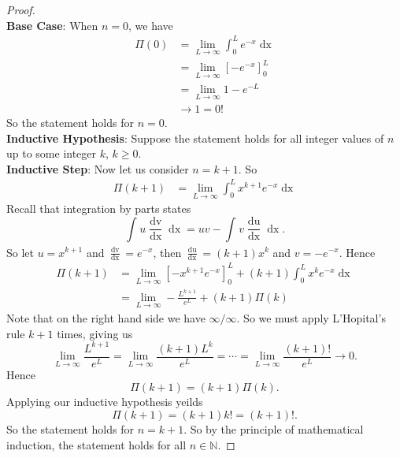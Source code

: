 \documentclass[12pt,oneside]{book}
\begin{document}
\begin{enumerate}
        \begin{proof} \hspace{1mm} \\
            \textbf{Base Case}: When $n = 0$, we have \begin{align*}
                \Pi(0) &= \lim_{L \to \infty}  \int_{0}^{L} e^{-x} \mathop{\mathrm{d}x} \\ 
                &= \lim_{L \to \infty}  \left[ - e^{-x} \right]_0^{L} \\
                &= \lim_{L \to \infty} 1 - e^{-L} \\
                &\to 1 = 0!  
            \end{align*}
            So the statement holds for $n = 0$. \\
            \textbf{Inductive Hypothesis}: Suppose the statement holds for all integer values of $n$ up to some integer $k$, $k \geq 0$. \\
            \textbf{Inductive Step}: Now let us consider $n = k + 1$. So \begin{align*}
                \Pi(k+1) &= \lim_{L \to \infty} \int_{0}^{L} x^{k + 1}e^{-x} \mathop{\mathrm{d}x}  
            \end{align*} Recall that integration by parts states \[
                \int_{}^{} u \frac{\mathop{\mathrm{d}v}}{\mathop{\mathrm{d}x}} \mathop{\mathrm{d}x} = uv - \int_{}^{} v \frac{\mathop{\mathrm{d}u}}{\mathop{\mathrm{d}x}} \mathop{\mathrm{d}x}   
            .\] So let $u = x^{k+1}$ and $\frac{\mathop{\mathrm{d}v}}{\mathop{\mathrm{d}x}} = e^{-x}$, then $\frac{\mathop{\mathrm{d}u}}{\mathop{\mathrm{d}x}} = (k+1) x^k$ and $v = -e^{-x}$. Hence \begin{align*}
                \Pi(k + 1) &= \lim_{L \to \infty} \left[ - x^{k+1}e^{-x} \right]_0^L + (k+1) \int_{0}^{L} x^k e^{-x} \mathop{\mathrm{d}x} \\
                &= \lim_{L \to \infty} - \frac{L^{k+1}}{e^{L}} + (k+1) \Pi(k)
            \end{align*} 
            Note that on the right hand side we have $\infty/\infty$. So we must apply L'Hopital's rule $k+1$ times, giving us \[
                \lim_{L \to \infty} \frac{L^{k + 1}}{e^L} = \lim_{L \to \infty} \frac{(k+1)L^k}{e^L} = \cdots = \lim_{L \to \infty} \frac{(k+1)!}{e^L} \to 0 
            .\] Hence \[
                \Pi(k+1) = (k+1) \Pi(k)
            .\] Applying our inductive hypothesis yeilds \[
                \Pi(k + 1) = (k+1) k! = (k+1)!
            .\] So the statement holds for $n = k + 1$. So by the principle of mathematical induction, the statement holds for all $n \in \mathbb{N}$.

\end{proof}
\end{enumerate}
\end{document}

